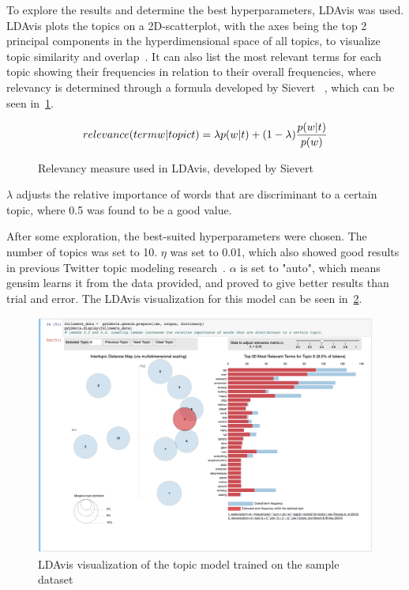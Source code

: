 To explore the results and determine the best hyperparameters, LDAvis was used.
LDAvis plots the topics on a 2D-scatterplot, with the axes being the top 2 principal components
in the hyperdimensional space of all topics, to visualize topic similarity and overlap~\cite{ldavis}.
It can also list the most relevant terms for each topic showing their frequencies in relation to their overall frequencies,
where relevancy is determined through a formula developed by Sievert \etAl~\cite{sievert2014ldavis},
which can be seen in~\cref{math:relevance}.

\begin{figure}
    \caption{Relevancy measure used in LDAvis, developed by Sievert \etAl~\cite{sievert2014ldavis}}
    \label{math:relevance}
    \begin{align*}
        relevance(term w | topic t) = \lambda \* p(w | t) + (1 - \lambda) \* \frac{p(w | t)}{p(w)}
    \end{align*}
\end{figure}

$\lambda$ adjusts the relative importance of words that are discriminant to a certain topic,
where 0.5 was found to be a good value.

After some exploration, the best-suited hyperparameters were chosen.
The number of topics was set to 10.
$\eta$ was set to 0.01, which also showed good results in previous Twitter topic modeling research~\cite{Hong2010}.
$\alpha$ is set to "auto", which means gensim learns it from the data provided, and proved to give better results than trial and error.
The LDAvis visualization for this model can be seen in~\cref{fig:ldavis}.

\begin{figure}
    \centering
    \caption{LDAvis visualization of the topic model trained on the sample dataset}
    \label{fig:ldavis}
    \includegraphics[width=\textwidth]{../images/LDAvis.png}
\end{figure}

